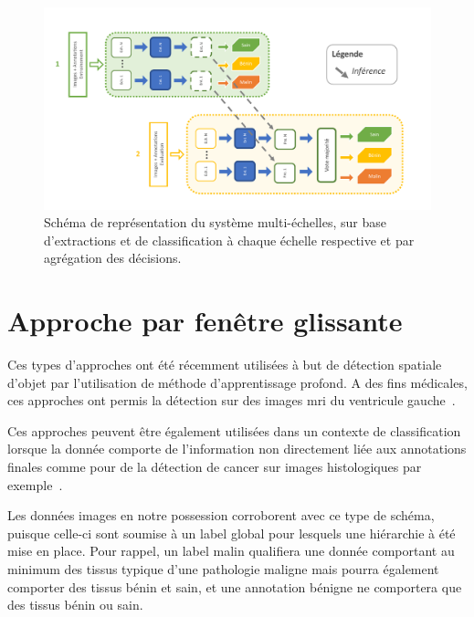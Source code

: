 \begin{figure}[H]
    \centering
    \includegraphics[width=\linewidth]{contents/chapter_5/resources/scheme_multiscale_decision.pdf}
    \caption{Schéma de représentation du système multi-échelles, sur base d'extractions et de classification à chaque échelle respective et par agrégation des décisions.}
    \label{fig:scheme_multiscale_decision}
\end{figure}\par


\section{Approche par fenêtre glissante}
Ces types d'approches ont été récemment utilisées à but de détection spatiale d'objet par l'utilisation de méthode d'apprentissage profond. A des fins médicales, ces approches ont permis la détection sur des images \gls{mri} du ventricule gauche~\cite{Helwan2017}.\par

Ces approches peuvent être également utilisées dans un contexte de classification lorsque la donnée comporte de l'information non directement liée aux annotations finales comme pour de la détection de cancer sur images histologiques par exemple~\cite{Hou2016,Alqudah2019}.\par

Les données images en notre possession corroborent avec ce type de schéma, puisque celle-ci sont soumise à un label global pour lesquels une hiérarchie à été mise en place. Pour rappel, un label malin qualifiera une donnée comportant au minimum des tissus typique d'une pathologie maligne mais pourra également comporter des tissus bénin et sain, et une annotation bénigne ne comportera que des tissus bénin ou sain.\par

